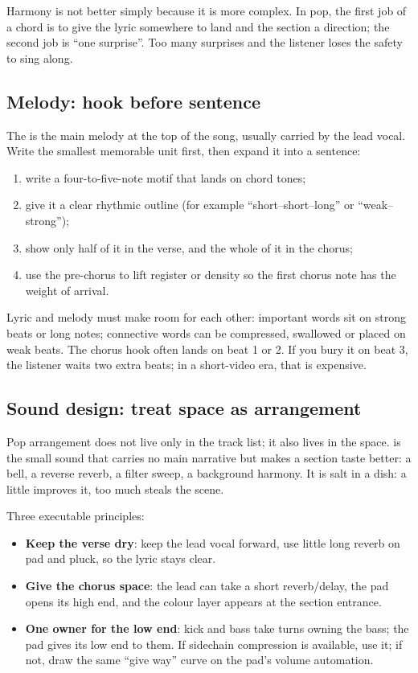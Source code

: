 Harmony is not better simply because it is more complex. In pop, the first job of a chord is to give the lyric somewhere to land and the section a direction; the second job is ``one surprise''. Too many surprises and the listener loses the safety to sing along.

\subsection{Melody: hook before sentence}
\label{sec:pop-melody}

The  is the main melody at the top of the song, usually carried by the lead vocal. Write the smallest memorable unit first, then expand it into a sentence:

\begin{enumerate}
\item write a four-to-five-note motif that lands on chord tones;
\item give it a clear rhythmic outline (for example ``short--short--long'' or ``weak--strong'');
\item show only half of it in the verse, and the whole of it in the chorus;
\item use the pre-chorus to lift register or density so the first chorus note has the weight of arrival.
\end{enumerate}

Lyric and melody must make room for each other: important words sit on strong beats or long notes; connective words can be compressed, swallowed or placed on weak beats. The chorus hook often lands on beat 1 or 2. If you bury it on beat 3, the listener waits two extra beats; in a short-video era, that is expensive.

\subsection{Sound design: treat space as arrangement}
\label{sec:pop-sound}

Pop arrangement does not live only in the track list; it also lives in the space.  is the small sound that carries no main narrative but makes a section taste better: a bell, a reverse reverb, a filter sweep, a background harmony. It is salt in a dish: a little improves it, too much steals the scene.

Three executable principles:

\begin{itemize}
\item \textbf{Keep the verse dry}: keep the lead vocal forward, use little long reverb on pad and pluck, so the lyric stays clear.
\item \textbf{Give the chorus space}: the lead can take a short reverb/delay, the pad opens its high end, and the colour layer appears at the section entrance.
\item \textbf{One owner for the low end}: kick and bass take turns owning the bass; the pad gives its low end to them. If sidechain compression is available, use it; if not, draw the same ``give way'' curve on the pad's volume automation.
\end{itemize}

